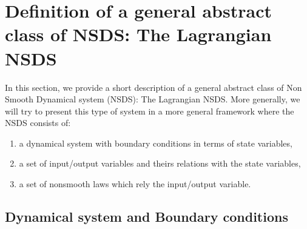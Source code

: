 \documentclass[10pt]{article}
\begin{document}







\section{Definition of a general abstract class of NSDS: The Lagrangian NSDS}
\label{Sec:descriptionNSDS}



In this section, we provide a short description of a general abstract class of Non Smooth Dynamical system (NSDS): The Lagrangian NSDS. More generally, we will try to present this type of system in a more general framework where the NSDS consists of:
\begin{enumerate}
\item a dynamical system with boundary conditions in terms of state variables,
\item a set of input/output variables and theirs relations with the state variables,
\item a set of  nonsmooth laws which rely  the input/output variable.
\end{enumerate}




\subsection{Dynamical system and Boundary conditions}
\end{document}
